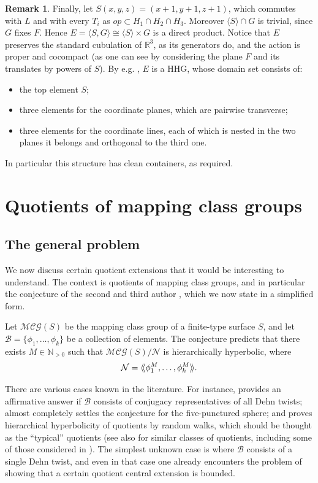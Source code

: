 \documentclass[svgnames]{amsart}
\theoremstyle{plain}
\theoremstyle{definition}
\newtheorem{rem}[thm]{Remark}
\newcommand{\cal}[1]{\mathcal{#1}}
\newcommand{\calG}{\cal{MCG}}
\newcommand{\N}{\cal{N}}
\newcommand{\R}{\mathbb{R}}
\renewcommand{\ll }{\langle\hspace{-.7mm}\langle }
\newcommand{\rr }{\rangle\hspace{-.7mm}\rangle }
\begin{document}
\begin{rem}
Finally, let $S(x,y,z)=(x+1,y+1,z+1)$, which commutes with $L$ and with every $T_i$ as $op\subset H_1\cap H_2\cap H_3$. Moreover $\langle S\rangle \cap G$ is trivial, since $G$ fixes $F$. Hence $E=\langle S,G\rangle\cong \langle S\rangle \times G$ is a direct product. Notice that $E$ preserves the standard cubulation of $\R^3$, as its generators do, and the action is proper and cocompact (as one can see by considering the plane $F$ and its translates by powers of $S$). By e.g. \cite[Remark 13.2]{HHS_I}, $E$ is a HHG, whose domain set consists of:
\begin{itemize}
    \item the top element $S$;
    \item three elements for the coordinate planes, which are pairwise transverse;
    \item three elements for the coordinate lines, each of which is nested in the two planes it belongs and orthogonal to the third one.
\end{itemize} 
In particular this structure has clean containers, as required.
\end{rem}

\section{Quotients of mapping class groups} \label{sec:quot_MCG}
\subsection{The general problem}
We now discuss certain quotient extensions that it would be interesting to understand. The context is quotients of mapping class groups, and in particular the conjecture of the second and third author \cite[Question 3]{MS_rigidity_MCG}, which we now state in a simplified form.

Let $\calG(S)$ be the mapping class group of a finite-type surface $S$, and let $\cal{B}=\{\phi_1,\dots,\phi_k\}$ be a collection of elements. The conjecture predicts that there exists $M\in \mathbb{N}_{>0}$ such that $\calG(S)/\N$ is hierarchically hyperbolic, where $$\N=\ll \phi_1^{M},\ldots, \phi_k^M \rr.
$$

There are various cases known in the literature. For instance, \cite[Theorem 7.1]{BHMS} provides an affirmative answer if $\cal B$ consists of conjugacy representatives of all Dehn twists; \cite{short_HHG:II} almost completely settles the conjecture for the five-punctured sphere; and \cite{random_quot} proves hierarchical hyperbolicity of quotients by random walks, which should be thought as the ``typical'' quotients (see also \cite{hhs_asdim} for similar classes of quotients, including some of those considered in \cite{claymangahas}). The simplest unknown case is where $\cal B$ consists of a single Dehn twist, and even in that case one already encounters the problem of showing that a certain quotient central extension is bounded.
 
\end{document}
